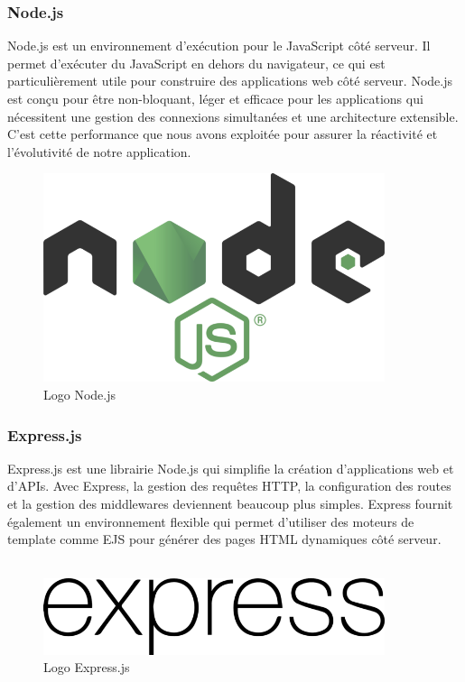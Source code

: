 {\subsubsection*{Node.js}
Node.js est un environnement d'exécution pour le JavaScript côté serveur. Il permet d'exécuter du JavaScript en dehors du navigateur, ce qui est particulièrement utile pour construire des applications web côté serveur. Node.js est conçu pour être non-bloquant, léger et efficace pour les applications qui nécessitent une gestion des connexions simultanées et une architecture extensible. C'est cette performance que nous avons exploitée pour assurer la réactivité et l'évolutivité de notre application.

\begin{figure}[H]
\begin{center}
\includegraphics[width=10cm]{assets/presentation/Node_logo_NodeJS-700x428.png}
\end{center}
\caption{Logo Node.js}
\end{figure}

\subsubsection*{Express.js}
Express.js est une librairie Node.js qui simplifie la création d'applications web et d'APIs. Avec Express, la gestion des requêtes HTTP, la configuration des routes et la gestion des middlewares deviennent beaucoup plus simples. Express fournit également un environnement flexible qui permet d'utiliser des moteurs de template comme EJS pour générer des pages HTML dynamiques côté serveur.\\\\

\begin{figure}[H]
\begin{center}
\includegraphics[width=10cm]{assets/presentation/express.js_Logo-700x156.png}
\end{center}
\caption{Logo Express.js}
\end{figure}

}
